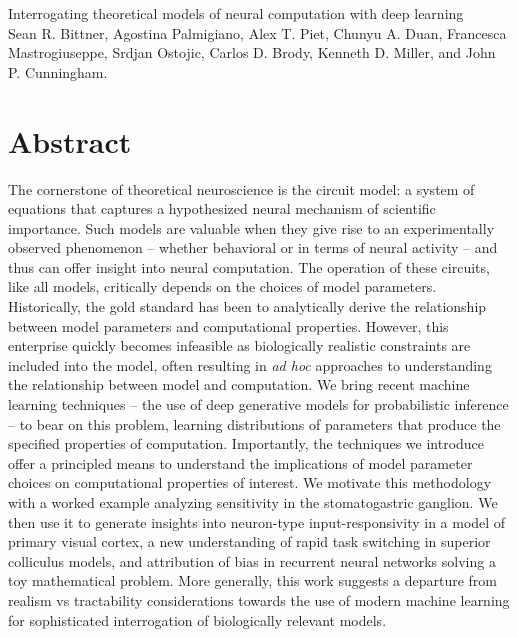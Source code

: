 \documentclass[11pt]{article}
\begin{document}
\medskip                        %

\thispagestyle{plain}
{\Large Interrogating theoretical models of neural computation with deep learning} \\
Sean R. Bittner, Agostina Palmigiano, Alex T. Piet, Chunyu A. Duan, Francesca Mastrogiuseppe, Srdjan Ostojic, Carlos D. Brody, Kenneth D. Miller, and John P. Cunningham.

\linenumbers
\section{Abstract}
The cornerstone of theoretical neuroscience is the circuit model: a system of equations that captures a hypothesized neural mechanism of scientific importance.  
Such models are valuable when they give rise to an experimentally observed phenomenon -- whether behavioral or in terms of neural activity -- and thus can offer insight into neural computation.  
The operation of these circuits, like all models, critically depends on the choices of model parameters.  
Historically, the gold standard has been to analytically derive the relationship between model parameters and computational properties.  
However, this enterprise quickly becomes infeasible as biologically realistic constraints are included into the model, often resulting in \emph{ad hoc} approaches to understanding the relationship between model and computation.  
We bring recent machine learning techniques -- the use of deep generative models for probabilistic inference -- to bear on this problem, learning distributions of parameters that produce the specified properties of computation.   
Importantly, the techniques we introduce offer a principled means to understand the implications of model parameter choices on computational properties of interest.  
We motivate this methodology with a worked example analyzing sensitivity in the stomatogastric ganglion.  
We then use it to generate insights into neuron-type input-responsivity in a model of primary visual cortex, a new understanding of rapid task switching in superior colliculus models, and attribution of bias in recurrent neural networks solving a toy mathematical problem. 
More generally, this work suggests a departure from realism vs tractability considerations towards the use of modern machine learning for sophisticated interrogation of biologically relevant models.
\end{document}
